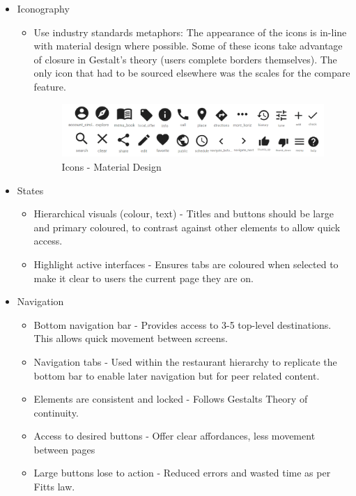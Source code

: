 \documentclass[a4 paper, 12pt]{article}
\begin{document}
\begin{itemize}
            \item Iconography
                \begin{itemize}
                    \item Use industry standards metaphors: The appearance of the icons is in-line with material design where possible. Some of these icons take advantage of closure in Gestalt's theory (users complete borders themselves). The only icon that had to be sourced elsewhere was the scales for the compare feature.  
                    \begin{figure} [H]
                        \centering
                        \includegraphics[width=\textwidth, frame]
                            {./Med_Fidelity/Med_Report/images/material_icons.PNG}    
                        \caption{Icons - Material Design}
                    \end{figure}   
                \end{itemize}  
                
            \item States
            \begin{itemize}
                \item Hierarchical visuals (colour, text) - Titles and buttons should be large and primary coloured, to contrast against other elements to allow quick access.
                \item Highlight active interfaces - Ensures tabs are coloured when selected to make it clear to users the current page they are on.
            \end{itemize}

            \item Navigation
            \begin{itemize}                
                \item Bottom navigation bar - Provides access to 3-5 top-level destinations. This allows quick movement between screens.
                \item Navigation tabs - Used within the restaurant hierarchy to replicate the bottom bar to enable later navigation but for peer related content.
                \item Elements are consistent and locked - Follows Gestalts Theory of continuity.
                \item Access to desired buttons - Offer clear affordances, less movement between pages
                \item Large buttons lose to action - Reduced errors and wasted time as per Fitts law.
            \end{itemize}
                

\end{itemize}
\end{document}
